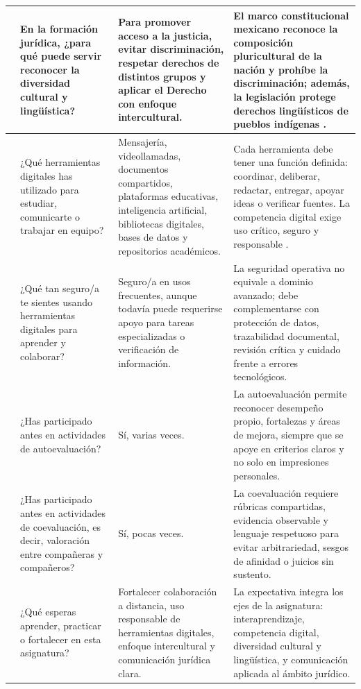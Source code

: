 \documentclass[
  spanish,
  letterpaper, oneside
]{article}
\begin{document}
\begin{longtable}{@{}>{\centering\arraybackslash}p{}>{\raggedright\arraybackslash}p{}>{\raggedright\arraybackslash}p{}>{\raggedright\arraybackslash}p{}@{}}
\midrule
5 & En la formación jurídica, ¿para qué puede servir reconocer la diversidad cultural y lingüística? & Para promover acceso a la justicia, evitar discriminación, respetar derechos de distintos grupos y aplicar el Derecho con enfoque intercultural. & El marco constitucional mexicano reconoce la composición pluricultural de la nación y prohíbe la discriminación; además, la legislación protege derechos lingüísticos de pueblos indígenas \citep{cpeum2026,leyDerechosLinguisticos2024}. \\
\midrule
6 & ¿Qué herramientas digitales has utilizado para estudiar, comunicarte o trabajar en equipo? & Mensajería, videollamadas, documentos compartidos, plataformas educativas, inteligencia artificial, bibliotecas digitales, bases de datos y repositorios académicos. & Cada herramienta debe tener una función definida: coordinar, deliberar, redactar, entregar, apoyar ideas o verificar fuentes. La competencia digital exige uso crítico, seguro y responsable \citep{unescoDigitalLiteracy2018}. \\
\midrule
7 & ¿Qué tan seguro/a te sientes usando herramientas digitales para aprender y colaborar? & Seguro/a en usos frecuentes, aunque todavía puede requerirse apoyo para tareas especializadas o verificación de información. & La seguridad operativa no equivale a dominio avanzado; debe complementarse con protección de datos, trazabilidad documental, revisión crítica y cuidado frente a errores tecnológicos. \\
\midrule
8 & ¿Has participado antes en actividades de autoevaluación? & Sí, varias veces. & La autoevaluación permite reconocer desempeño propio, fortalezas y áreas de mejora, siempre que se apoye en criterios claros y no solo en impresiones personales. \\
\midrule
9 & ¿Has participado antes en actividades de coevaluación, es decir, valoración entre compañeras y compañeros? & Sí, pocas veces. & La coevaluación requiere rúbricas compartidas, evidencia observable y lenguaje respetuoso para evitar arbitrariedad, sesgos de afinidad o juicios sin sustento. \\
\midrule
10 & ¿Qué esperas aprender, practicar o fortalecer en esta asignatura? & Fortalecer colaboración a distancia, uso responsable de herramientas digitales, enfoque intercultural y comunicación jurídica clara. & La expectativa integra los ejes de la asignatura: interaprendizaje, competencia digital, diversidad cultural y lingüística, y comunicación aplicada al ámbito jurídico. \\
\end{longtable}
\endgroup
\end{document}
